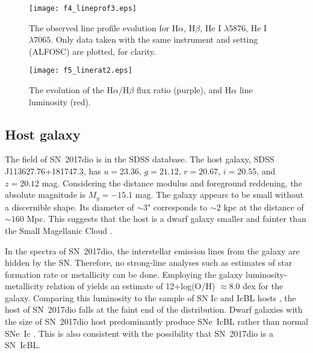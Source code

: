 \documentclass[twocolumn]{aastex61}
\begin{document}


\begin{figure}
\centering
\texttt{[image: f4\_lineprof3.eps]}
\caption{The observed line profile evolution for H$\alpha$, H$\beta$, He I $\lambda$5876, He I $\lambda7065$.
Only data taken with the same instrument and setting (ALFOSC) are plotted, for clarity.
}
\label{lineprof}
\end{figure}



\begin{figure}
\centering
\texttt{[image: f5\_linerat2.eps]}
\caption{The evolution of the H$\alpha$/H$\beta$ flux ratio (purple), and H$\alpha$ line luminosity (red). }
\label{linerat}
\end{figure}


\subsection{Host galaxy}

The field of SN~2017dio is in the SDSS database. The host galaxy, SDSS J113627.76+181747.3, has $u=23.36$, $g=21.12$, $r=20.67$, $i=20.55$, and $z=20.12$ mag. Considering the distance modulus and foreground reddening, the absolute magnitude is $M_g = -15.1$ mag. The galaxy appears to be small without a discernible shape. Its diameter of $\sim3$" corresponds to $\sim2$ kpc at the distance of $\sim160$ Mpc. This suggests that the host is a dwarf galaxy smaller and fainter than the Small Magellanic Cloud \citep[$M_V = -16.8$ mag, ][]{mcconachie12}.

In the spectra of SN~2017dio, the interstellar emission lines from the galaxy are hidden by the SN. Therefore, no strong-line analyses such as estimates of star formation rate or metallicity can be done. Employing the galaxy luminosity-metallicity relation of \citet{tremonti04} yields an estimate of 12+log(O/H) $\approx8.0$ dex for the galaxy.
Comparing this luminosity to the sample of SN Ic and IcBL hosts \citep{modjaz08}, the host of SN~2017dio falls at the faint end of the distribution. Dwarf galaxies with the size of SN~2017dio host predominantly produce SNe~IcBL rather than normal SNe~Ic \citep{arcavi10}. This is {also consistent} with the possibility that SN~2017dio is a SN~IcBL.
\end{document}
